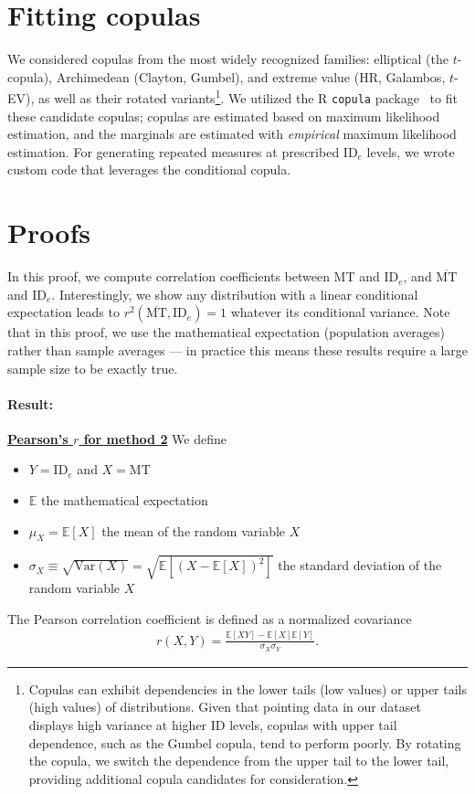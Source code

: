 \documentclass[manuscript,review,anonymous]{acmart}
\newcommand{\mmt}{\ensuremath{\overline{\text{MT}}}\xspace}
\newcommand{\ide}{\ensuremath{{\text{ID}_e}}\xspace}
\begin{document}



\appendix

\section{Fitting copulas \label{app:copula_method}}
We considered copulas from the most widely recognized families: elliptical (\eg the $t$-copula), Archimedean (\eg Clayton, Gumbel), and extreme value (\eg HR, Galambos, $t$-EV), as well as their rotated variants\footnote{Copulas can exhibit dependencies in the lower tails (low values) or upper tails (high values) of distributions. Given that pointing data in our dataset displays high variance at higher ID levels, copulas with upper tail dependence, such as the Gumbel copula, tend to perform poorly. By rotating the copula, we switch the dependence from the upper tail to the lower tail, providing additional copula candidates for consideration.}.
We utilized the R \texttt{copula} package~\cite{yan2007} to fit these candidate copulas; copulas are estimated based on maximum likelihood estimation, and the marginals are estimated with \textit{empirical} maximum likelihood estimation.
For generating repeated measures at prescribed \ide levels, we wrote custom code that leverages the conditional copula.



\section{Proofs \label{app:proofs}}
In this proof, we compute correlation coefficients between MT and \ide, and \mmt and \ide. Interestingly, we show any distribution with a linear conditional expectation leads to $r^2(\mmt, \ide) = 1$ whatever its conditional variance. Note that in this proof, we use the mathematical expectation (\ie population averages) rather than sample averages --- in practice this means these results require a large sample size to be exactly true.



\paragraph{Result: }  \hyperlink{res:method_2__correlation}{\textbf{Pearson's $r$ for method 2}}
We define
\begin{itemize}
	\item $Y=\ide$ and $X=\text{MT}$
	\item $\mathbb{E}$ the mathematical expectation
	\item $\mu_X = \mathbb{E}[X]$ the mean of the random variable $X$
	\item $\sigma_X \equiv \sqrt{\text{Var}(X)} = \sqrt{\mathbb{E}[(X - \mathbb{E}[X])^2]}$ the standard deviation of the random variable $X$
\end{itemize}
The Pearson correlation coefficient is defined as a normalized covariance
\begin{align}
	r(X,Y) = \frac{\mathbb{E}[XY] - \mathbb{E}[X]\mathbb{E}[Y]}{\sigma_X \sigma_Y}.
\end{align}
\end{document}
